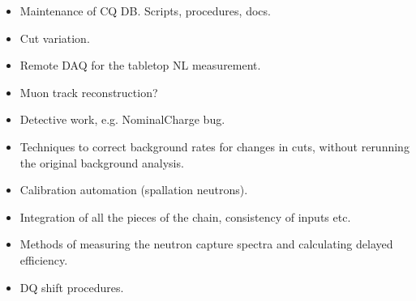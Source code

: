 \begin{itemize}
\item Maintenance of CQ DB. Scripts, procedures, docs.
\item Cut variation.
\item Remote DAQ for the tabletop NL measurement.
\item Muon track reconstruction?
\item Detective work, e.g. NominalCharge bug.
\item Techniques to correct background rates for changes in cuts, without rerunning the original background analysis.
\item Calibration automation (spallation neutrons).
\item Integration of all the pieces of the chain, consistency of inputs etc.
\item Methods of measuring the neutron capture spectra and calculating delayed efficiency.
\item DQ shift procedures.
\end{itemize}